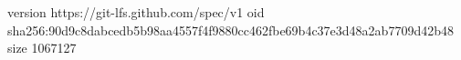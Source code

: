 version https://git-lfs.github.com/spec/v1
oid sha256:90d9c8dabcedb5b98aa4557f4f9880cc462fbe69b4c37e3d48a2ab7709d42b48
size 1067127
